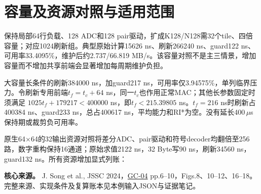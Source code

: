 \section{容量及资源对照与适用范围}

保持局部64行负载、128 ADC和128 pair驱动，扩成K128/N128需32个tile、四倍容量；对应1024刷新组。典型原始计算15626 ns、刷新266240 ns、guard122 ns、可用率33.4095\%，维护后约2.737/66.819 MB/s。该容量对照不是主三情景，增加容量而不增加共享前端会显著增加每周期维护负担。

大容量长条件的刷新384000 ns，加guard217 ns，可用率仅3.94575\%，单列临界压力。令刷新专用前端$t_f=t_c+64$ ns，同一$t_c$也作用正常MAC；其他长参数固定时须满足 $1025t_f+179217<400000$ ns，即$t_f<215.39805$ ns。$t_f=216$ ns时刷新占400384 ns、guard233 ns，总占400617 ns，平均能力和RI*为空。没有延长400\,$\mu$s保持期或裁剪负可用率。

原生64×64的32输出资源对照将差分ADC、pair驱动和符号decoder均翻倍至256路，数字重构保持16通道；原始求值2122 ns，32 Byte写90 ns，刷新34560 ns，guard132 ns。所有资源增加显式列账：


\medskip
\noindent\textbf{核心来源。} J. Song et al., JSSC 2024，\href{https://doi.org/10.1109/JSSC.2023.3339887}{GC-04} pp.6--10，Figs.8、10--12、16--18。完整来源、实现条件及复算账本见本例输入JSON与证据笔记。

